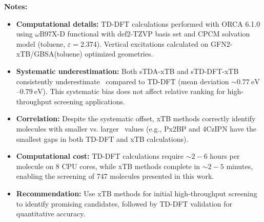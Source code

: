 \textbf{Notes:}
\begin{itemize}
\item \textbf{Computational details:} TD-DFT calculations performed with ORCA 6.1.0 using 
$\omega$B97X-D functional with def2-TZVP basis set and CPCM solvation model (toluene, $\varepsilon=2.374$). 
Vertical excitations calculated on GFN2-xTB/GBSA(toluene) optimized geometries.

\item \textbf{Systematic underestimation:} Both sTDA-xTB and sTD-DFT-xTB consistently 
underestimate \deltaest\ compared to TD-DFT (mean deviation $\sim\qty{0.77}{\electronvolt}$--$\qty{0.79}{\electronvolt}$). This systematic 
bias does not affect relative ranking for high-throughput screening applications.

\item \textbf{Correlation:} Despite the systematic offset, xTB methods correctly identify 
molecules with smaller vs. larger \deltaest\ values (e.g., Px2BP and 4CzIPN have the smallest 
gaps in both TD-DFT and xTB calculations).

\item \textbf{Computational cost:} TD-DFT calculations require $\sim2-6$ hours per molecule 
on 8 CPU cores, while xTB methods complete in $\sim2-5$ minutes, enabling the screening of 
747 molecules presented in this work.

\item \textbf{Recommendation:} Use xTB methods for initial high-throughput screening to 
identify promising candidates, followed by TD-DFT validation for quantitative accuracy.
\end{itemize}

